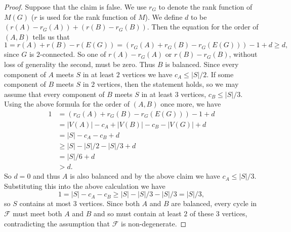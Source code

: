 \documentclass[10pt,a4paper]{amsart}
\begin{document}
\begin{proof}
Suppose that the claim is false.
We use $r_G$ to denote the rank function of $M(G)$ ($r$ is used for the rank function of $M$). We define $d$ to be $(r(A) - r_G(A)) + (r(B) - r_G(B))$. Then the equation for the order of $(A,B)$ tells us that
\[
1 = r(A) + r(B) - r(E(G)) = (r_G(A) + r_G(B) - r_G(E(G))) - 1 + d \ge d,
\]
since $G$ is $2$-connected. So one of $r(A) - r_G(A)$ or $r(B) - r_G(B)$, without loss of generality the second, must be zero. Thus $B$ is balanced. Since every component of $A$ meets $S$ in at least $2$ vertices we have $c_A \le |S|/2$. 
If some component of $B$ meets $S$ in $2$ vertices, then the statement holds, so we may assume that every component of $B$ meets $S$ in at least $3$ vertices,  $c_B \le |S|/3$. Using the above formula for the order of $(A,B)$ once more, we have
\begin{align*}
1 &= (r_G(A) + r_G(B) - r_G(E(G))) - 1 + d \\
&= |V(A)| - c_A + |V(B)| - c_B - |V(G)| + d \\ 
&= |S| - c_A - c_B + d \\
&\ge |S| - |S|/2 - |S|/3 + d \\
&= |S|/6 + d \\
&> d.
\end{align*}
So $d = 0$ and thus $A$ is also balanced and by the above claim we have $c_A \le |S|/3$. Substituting this into the above calculation we have
\[
1 = |S| - c_A - c_B \ge |S| - |S|/3 - |S|/3 = |S|/3,
\]
so $S$ contains at most $3$ vertices. Since both $A$ and $B$ are balanced, every cycle in $\mathcal{F}$ must meet both $A$ and $B$ and so must contain at least $2$ of these $3$ vertices, contradicting the assumption that $\mathcal{F}$ is non-degenerate.
\end{proof}
\end{document}
